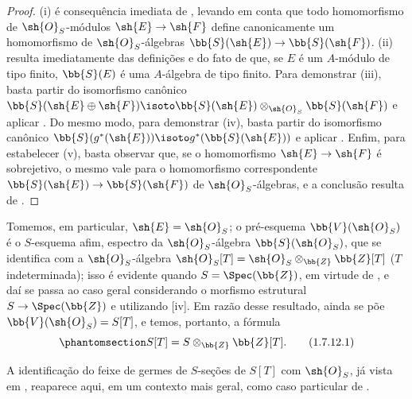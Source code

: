\documentclass[oneside,10pt]{amsart}
\makeatletter
\newcommand{\ega@arrow}[2]{\mathchoice{#1}{#2}{#2}{#2}}
\renewcommand{\to}{\ega@arrow{\longrightarrow}{\rightarrow}}
\newcommand{\oldpage}[2][]{\marginnote{\normalfont\footnotesize\textbf{#1}~|~#2}\ignorespaces}
\let\EGAOriginalLabel\label
\renewcommand{\label}[1]{\phantomsection\EGAOriginalLabel{#1}}
\makeatother
\begin{document}
\begin{proof}
(i) é consequência imediata de , levando em conta que todo homomorfismo de $\sh{O}_S$-módulos $\sh{E}\to\sh{F}$ define canonicamente um homomorfismo de $\sh{O}_S$-álgebras $\bb{S}(\sh{E})\to\bb{S}(\sh{F})$.
(ii) resulta imediatamente das definições  e do fato de que, se $E$ é um $A$-módulo de tipo finito, $\bb{S}(E)$ é uma $A$-álgebra de tipo finito.
Para demonstrar (iii), basta partir do isomorfismo canônico $\bb{S}(\sh{E}\oplus\sh{F})\isoto\bb{S}(\sh{E})\otimes_{\sh{O}_S}\bb{S}(\sh{F})$  e aplicar .
Do mesmo modo, para demonstrar (iv), basta partir do isomorfismo canônico $\bb{S}(g^*(\sh{E}))\isoto g^*(\bb{S}(\sh{E}))$  e aplicar .
Enfim, para estabelecer (v), basta observar que, se o homomorfismo $\sh{E}\to\sh{F}$ é sobrejetivo, o mesmo vale para o homomorfismo correspondente $\bb{S}(\sh{E})\to\bb{S}(\sh{F})$ de $\sh{O}_S$-álgebras, e a conclusão resulta de .
\end{proof}

\begin{env}[1.7.12]
\label{II.1.7.12}
Tomemos, em particular, $\sh{E}=\sh{O}_S$; o pré-esquema $\bb{V}(\sh{O}_S)$ é o $S$-esquema afim, espectro da $\sh{O}_S$-álgebra $\bb{S}(\sh{O}_S)$, que se identifica com a $\sh{O}_S$-álgebra $\sh{O}_S[T]=\sh{O}_S\otimes_\bb{Z}\bb{Z}[T]$
\oldpage[II]{18}
($T$ indeterminada); isso é evidente quando $S=\Spec(\bb{Z})$, em virtude de , e daí se passa ao caso geral considerando o morfismo estrutural $S\to\Spec(\bb{Z})$ e utilizando [iv].
Em razão desse resultado, ainda se põe $\bb{V}(\sh{O}_S)=S[T]$, e temos, portanto, a fórmula
\[
\label{II.1.7.12.1}
  S[T]=S\otimes_\bb{Z}\bb{Z}[T].
  \tag{1.7.12.1}
\]

A identificação do feixe de germes de $S$-seções de $S[T]$ com $\sh{O}_S$, já vista em , reaparece aqui, em um contexto mais geral, como caso particular de .
\end{env}
\end{document}
